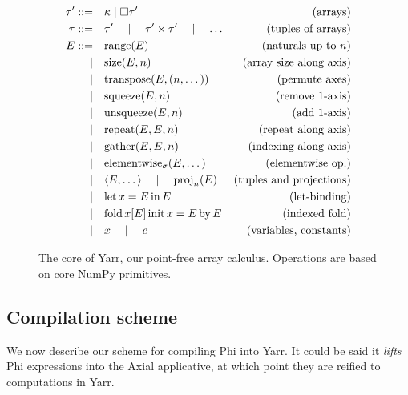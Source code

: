 \vspace*{\fill}
\begin{figure}[h]
    \centering
    \begin{align*}
    \tau' ::=& \quad\kappa \mid \Box \tau' &\text{(arrays)} \\
    \tau ::=& \quad\tau' \quad\mid\quad \tau' \times \tau' \quad\mid\quad \dots &\text{(tuples of arrays)} \\
    E ::=&\quad \mathrm{range}(E)   &\text{(naturals up to }n\text{)} \\
    \mid&\quad \mathrm{size}(E, n)  &\text{(array size along axis)} \\
    \mid&\quad \mathrm{transpose}(E, (n, \dots)) &\text{(permute axes)} \\ 
    \mid&\quad \mathrm{squeeze}(E, n) &\text{(remove 1-axis)} \\
    \mid&\quad \mathrm{unsqueeze}(E, n) &\text{(add 1-axis)} \\
    \mid&\quad \mathrm{repeat}(E, E, n) &\text{(repeat along axis)} \\
    \mid&\quad \mathrm{gather}(E, E, n) &\text{(indexing along axis)} \\ 
    \mid&\quad \mathrm{elementwise}_\sigma(E, \dots) &\text{(elementwise op.)} \\
    \mid&\quad \langle E, \dots \rangle \quad\mid\quad \mathrm{proj}_n(E) &\text{(tuples and projections)} \\
    \mid&\quad \mathrm{let}\,{x}={E}\,\mathrm{in}\,{E} &\text{(let-binding)} \\
    \mid&\quad \mathrm{fold}\,{x}[{E}]\,\mathrm{init}\,{x} = {E}\,\mathrm{by}\,{E} &\text{(indexed fold)} \\
    \mid&\quad x \quad\mid\quad c  &\text{(variables, constants)}
    \end{align*}
    \caption{The core of Yarr, our point-free array calculus. Operations are based on core NumPy primitives.}
    \label{fig:yarr-definition}
\end{figure}
\vspace*{\fill}

\needspace{10em}
\subsection{Compilation scheme}

\newcommand{\denot}[1]{\left\llbracket{#1}\right\rrbracket}

We now describe our scheme for compiling Phi into Yarr. It could be said it \textit{lifts} Phi expressions into the Axial applicative, at which point they are reified to computations in Yarr.

